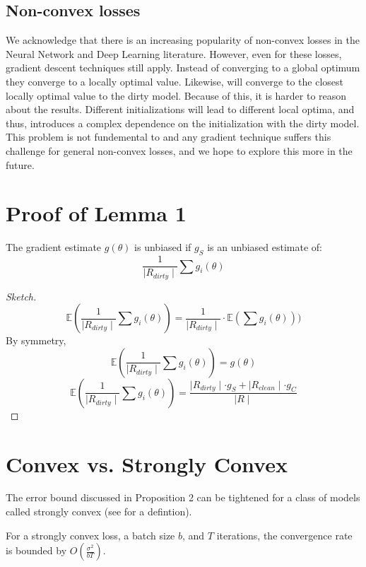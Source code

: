 \subsection{Non-convex losses}\label{non-convex}
We acknowledge that there is an increasing popularity of non-convex losses in the Neural Network and Deep Learning literature. 
However, even for these losses, gradient descent techniques still apply. 
Instead of converging to a global optimum they converge to a locally optimal value. 
Likewise, \sys will converge to the closest locally optimal value to the dirty model. 
Because of this, it is harder to reason about the results.
Different initializations will lead to different local optima, and thus, introduces a complex dependence on the initialization with the dirty model.
This problem is not fundemental to \sys and any gradient technique suffers this challenge for general non-convex losses, and we hope to explore this more in the future.

\section{Proof of Lemma 1}\label{unbiased1-deriv}
\begin{lemma}
The gradient estimate $g(\theta)$ is unbiased if $g_S$ is an unbiased estimate of:
\[
\frac{1}{\mid R_{dirty} \mid} \sum g_i(\theta)
\]
\end{lemma}
\begin{proof}[Sketch]
\[
\mathbb{E}(\frac{1}{\mid R_{dirty} \mid} \sum g_i(\theta)) = \frac{1}{\mid R_{dirty} \mid} \cdot \mathbb{E}(\sum g_i(\theta)))
\]
By symmetry, 
\[
\mathbb{E}(\frac{1}{\mid R_{dirty} \mid} \sum g_i(\theta)) = g(\theta)
\]
\[
\mathbb{E}(\frac{1}{\mid R_{dirty} \mid} \sum g_i(\theta)) = \frac{\mid R_{dirty} \mid \cdot g_S + \mid R_{clean} \mid \cdot g_C  }{\mid R \mid}
\]
\end{proof}

\section{Convex vs. Strongly Convex}
The error bound discussed in Proposition 2 can be tightened for a class of models called strongly convex (see \cite{bertsekas2011incremental} for a defintion). 

\begin{proposition}
For a strongly convex loss, a batch size $b$, and $T$ iterations, the convergence rate is bounded by $O(\frac{\sigma^2}{bT})$. 
\end{proposition}

